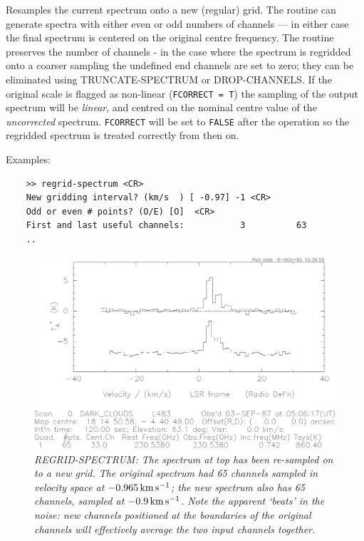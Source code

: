 \documentclass[11pt,twoside]{report}
\begin{document}
Resamples  the current spectrum onto a new (regular)
grid. The routine can generate spectra with either even or odd numbers of
channels --- in either case the final spectrum is centered on the original
centre frequency. The routine preserves the number of channels - in the case
where the spectrum is regridded onto a coarser sampling the undefined end
channels are set to zero; they can be eliminated using TRUNCATE-SPECTRUM or
DROP-CHANNELS.   If the original
scale is flagged as non-linear (\verb+FCORRECT = T+) 
the sampling of the output spectrum will be {\em linear}, and centred on the
nominal centre value of the {\em uncorrected} spectrum. \verb+FCORRECT+ will be
set to \verb+FALSE+ after the operation so the regridded spectrum is treated
correctly from then on. 

Examples:
\begin{verbatim}
    >> regrid-spectrum <CR>
    New gridding interval? (km/s  ) [ -0.97] -1 <CR>
    Odd or even # points? (O/E) [O]  <CR>
    First and last useful channels:           3          63
    ..
\end{verbatim}

\begin{figure}[htbp]
\begin{center}
\includegraphics[scale=0.65]{regrid.ps}
\protect\parbox{5.5in}
{\caption[REGRID]
{\sl
REGRID-SPECTRUM: The spectrum at top has been re-sampled on to a new grid. The
original spectrum had 65 channels sampled in velocity space at $-0.965 {\rm\,km\,s^{-1}}$;
the new spectrum also has 65 channels, sampled at $-0.9{\rm\,km\,s^{-1}}$. Note the 
apparent `beats' in the noise: new channels positioned at the boundaries of
the original channels will effectively average the two input channels together.
\label{REGRID}
}
}
\end{center}
\end{figure}
\end{document}
